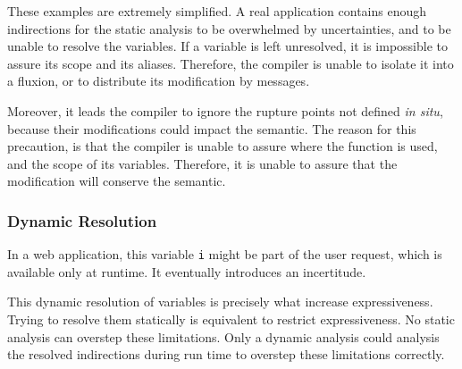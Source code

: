 These examples are extremely simplified.
A real application contains enough indirections for the static analysis to be overwhelmed by uncertainties, and to be unable to resolve the variables.
If a variable is left unresolved, it is impossible to assure its scope and its aliases.
Therefore, the compiler is unable to isolate it into a fluxion, or to distribute its modification by messages.

Moreover, it leads the compiler to ignore the rupture points not defined \textit{in situ}, because their modifications could impact the semantic.
The reason for this precaution, is that the compiler is unable to assure where the function is used, and the scope of its variables.
Therefore, it is unable to assure that the modification will conserve the semantic.

\subsubsection{Dynamic Resolution}

In a web application, this variable \texttt{i} might be part of the user request, which is available only at runtime.
It eventually introduces an incertitude.

This dynamic resolution of variables is precisely what increase expressiveness.
Trying to resolve them statically is equivalent to restrict expressiveness.
No static analysis can overstep these limitations.
Only a dynamic analysis could analysis the resolved indirections during run time to overstep these limitations correctly.


